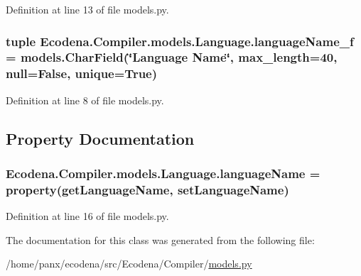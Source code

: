 Definition at line 13 of file models.py.

\hypertarget{class_ecodena_1_1_compiler_1_1models_1_1_language_a8aafd0b732996210ac1fc87d9fdc77f7}{
\subsubsection[{languageName\_\-f}]{\setlength{\rightskip}{0pt plus 5cm}tuple {\bf Ecodena.Compiler.models.Language.languageName\_\-f} = models.CharField(\char`\"{}Language Name\char`\"{}, max\_\-length=40, null=False, unique=True)}}
\label{de/dfd/class_ecodena_1_1_compiler_1_1models_1_1_language_a8aafd0b732996210ac1fc87d9fdc77f7}


Definition at line 8 of file models.py.



\subsection{Property Documentation}
\hypertarget{class_ecodena_1_1_compiler_1_1models_1_1_language_a23408835afbaa4a86bd3933f01b07861}{
\subsubsection[{languageName}]{\setlength{\rightskip}{0pt plus 5cm}Ecodena.Compiler.models.Language.languageName = property(getLanguageName, setLanguageName)}}
\label{de/dfd/class_ecodena_1_1_compiler_1_1models_1_1_language_a23408835afbaa4a86bd3933f01b07861}


Definition at line 16 of file models.py.



The documentation for this class was generated from the following file:\begin{DoxyCompactItemize}
\item 
/home/panx/ecodena/src/Ecodena/Compiler/\hyperlink{_compiler_2models_8py}{models.py}\end{DoxyCompactItemize}

